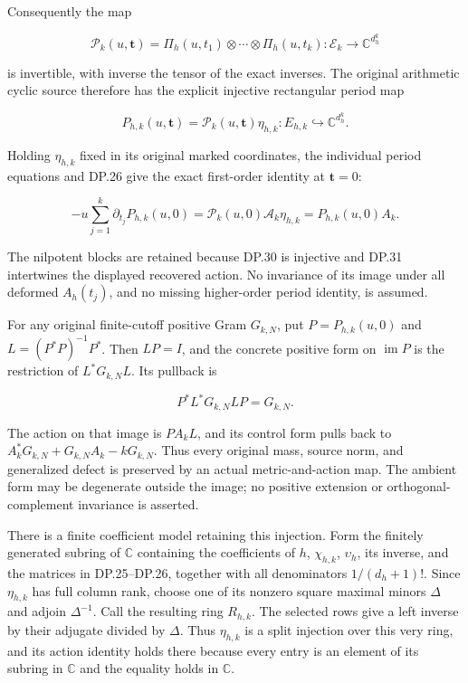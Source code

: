 Consequently the map

\[
\mathscr P_k(u,\mathbf t)
=\Pi_h(u,t_1)\otimes\cdots\otimes\Pi_h(u,t_k)
:\mathcal E_k\longrightarrow\mathbb C^{d_h^k}
\tag{DP.29}
\]

is invertible, with inverse the tensor of the exact inverses. The original arithmetic cyclic source therefore has the explicit injective rectangular period map

\[
P_{h,k}(u,\mathbf t)=\mathscr P_k(u,\mathbf t)\eta_{h,k}
:E_{h,k}\hookrightarrow\mathbb C^{d_h^k}.
\tag{DP.30}
\]

Holding \(\eta_{h,k}\) fixed in its original marked coordinates, the individual period equations and DP.26 give the exact first-order identity at \(\mathbf t=0\):

\[
-u\sum_{j=1}^k\partial_{t_j}P_{h,k}(u,0)
=\mathscr P_k(u,0)\mathcal A_k\eta_{h,k}
=P_{h,k}(u,0)A_k.
\tag{DP.31}
\]

The nilpotent blocks are retained because DP.30 is injective and DP.31 intertwines the displayed recovered action. No invariance of its image under all deformed \(A_h(t_j)\), and no missing higher-order period identity, is assumed.

For any original finite-cutoff positive Gram \(G_{k,N}\), put \(P=P_{h,k}(u,0)\) and \(L=(P^*P)^{-1}P^*\). Then \(LP=I\), and the concrete positive form on \(\operatorname{im}P\) is the restriction of \(L^*G_{k,N}L\). Its pullback is

\[
P^*L^*G_{k,N}LP=G_{k,N}.
\tag{DP.32}
\]

The action on that image is \(PA_kL\), and its control form pulls back to \(A_k^*G_{k,N}+G_{k,N}A_k-kG_{k,N}\). Thus every original mass, source norm, and generalized defect is preserved by an actual metric-and-action map. The ambient form may be degenerate outside the image; no positive extension or orthogonal-complement invariance is asserted.

There is a finite coefficient model retaining this injection. Form the finitely generated subring of \(\mathbb C\) containing the coefficients of \(h\), \(\chi_{h,k}\), \(\upsilon_h\), its inverse, and the matrices in DP.25--DP.26, together with all denominators \(1/(d_h+1)!\). Since \(\eta_{h,k}\) has full column rank, choose one of its nonzero square maximal minors \(\Delta\) and adjoin \(\Delta^{-1}\). Call the resulting ring \(R_{h,k}\). The selected rows give a left inverse by their adjugate divided by \(\Delta\). Thus \(\eta_{h,k}\) is a split injection over this very ring, and its action identity holds there because every entry is an element of its subring in \(\mathbb C\) and the equality holds in \(\mathbb C\).

